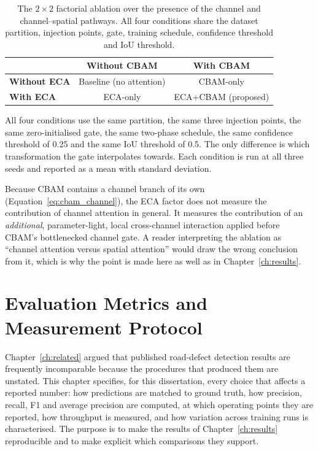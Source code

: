 \documentclass[MScCS]{uccthesis}
\begin{document}
\begin{table}[htbp]
\centering
\small
\begin{tabular}{@{}lcc@{}}
\toprule
 & \textbf{Without CBAM} & \textbf{With CBAM} \\
\midrule
\textbf{Without ECA} & Baseline (no attention) & CBAM-only \\
\textbf{With ECA}    & ECA-only                & ECA+CBAM (proposed) \\
\bottomrule
\end{tabular}
\caption[Factorial ablation design.]
        {\label{tab:factorial}The $2 \times 2$ factorial ablation over the
         presence of the channel and channel--spatial pathways. All four
         conditions share the dataset partition, injection points, gate,
         training schedule, confidence threshold and IoU threshold.}
\end{table}

All four conditions use the same partition, the same three injection points,
the same zero-initialised gate, the same two-phase schedule, the same
confidence threshold of 0.25 and the same IoU threshold of 0.5. The only
difference is which transformation the gate interpolates towards. Each
condition is run at all three seeds and reported as a mean with standard
deviation.

Because CBAM contains a channel branch of its own
(Equation~\eqref{eq:cbam_channel}), the ECA factor does not measure the
contribution of channel attention in general. It measures the contribution of
an \emph{additional}, parameter-light, local cross-channel interaction applied
before CBAM's bottlenecked channel gate. A reader interpreting the ablation as
``channel attention versus spatial attention'' would draw the wrong conclusion
from it, which is why the point is made here as well as in
Chapter~\ref{ch:results}.



\chapter{Evaluation Metrics and Measurement Protocol}
\label{ch:metrics}

Chapter~\ref{ch:related} argued that published road-defect detection results
are frequently incomparable because the procedures that produced them are
unstated. This chapter specifies, for this dissertation, every choice that
affects a reported number: how predictions are matched to ground truth, how
precision, recall, F1 and average precision are computed, at which operating
points they are reported, how throughput is measured, and how variation across
training runs is characterised. The purpose is to make the results of
Chapter~\ref{ch:results} reproducible and to make explicit which comparisons
they support.
\end{document}

